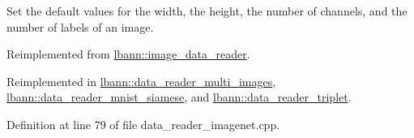 Set the default values for the width, the height, the number of channels, and the number of labels of an image. 



Reimplemented from \hyperlink{classlbann_1_1image__data__reader_a8e9dbeaa0239d56597455cc23787a21d}{lbann\+::image\+\_\+data\+\_\+reader}.



Reimplemented in \hyperlink{classlbann_1_1data__reader__multi__images_a5abe6981d750bc145e50f6141772805c}{lbann\+::data\+\_\+reader\+\_\+multi\+\_\+images}, \hyperlink{classlbann_1_1data__reader__mnist__siamese_a7e1c9530b5d56a0835db8a30af980164}{lbann\+::data\+\_\+reader\+\_\+mnist\+\_\+siamese}, and \hyperlink{classlbann_1_1data__reader__triplet_a88bc385a2d42e9f78a768ff496036843}{lbann\+::data\+\_\+reader\+\_\+triplet}.



Definition at line 79 of file data\+\_\+reader\+\_\+imagenet.\+cpp.


